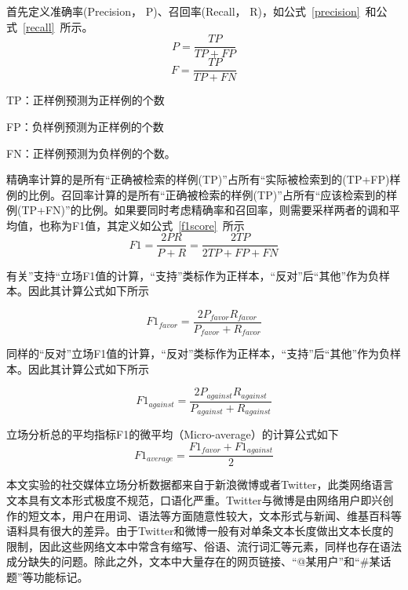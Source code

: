 首先定义准确率(Precision， P)、召回率(Recall， R)，如公式~\ref{precision}~和公式~\ref{recall}~所示。
\begin{equation}\label{precision}P=\frac{TP}{TP+FP}\end{equation}
\begin{equation}\label{recall}F=\frac{TP}{TP+FN}\end{equation}

TP：正样例预测为正样例的个数

FP：负样例预测为正样例的个数

FN：正样例预测为负样例的个数。

精确率计算的是所有“正确被检索的样例(TP)”占所有“实际被检索到的(TP+FP)样例的比例。召回率计算的是所有“正确被检索的样例(TP)”占所有“应该检索到的样例(TP+FN)”的比例。如果要同时考虑精确率和召回率，则需要采样两者的调和平均值，也称为F1值，其定义如公式~\ref{f1score}~所示
\begin{equation}\label{f1score}F1=\frac{2PR}{P+R}=\frac{2TP}{2TP+FP+FN}\end{equation}

有关”支持“立场F1值的计算，“支持”类标作为正样本，“反对”后“其他”作为负样本。因此其计算公式如下所示

\begin{equation}\label{f1favor}F1_{favor}=\frac{2P_{favor}R_{favor}}{P_{favor}+R_{favor}}\end{equation}

同样的“反对”立场F1值的计算，“反对”类标作为正样本，“支持”后“其他”作为负样本。因此其计算公式如下所示

\begin{equation}\label{f1against}F1_{against}=\frac{2P_{against}R_{against}}{P_{against}+R_{against}}\end{equation}

立场分析总的平均指标F1的微平均（Micro-average）的计算公式如下
\begin{equation}\label{f1average}F1_{average}=\frac{F1_{favor}+F1_{against}}{2}\end{equation}

本文实验的社交媒体立场分析数据都来自于新浪微博或者Twitter，此类网络语言文本具有文本形式极度不规范，口语化严重。Twitter与微博是由网络用户即兴创作的短文本，用户在用词、语法等方面随意性较大，文本形式与新闻、维基百科等语料具有很大的差异。由于Twitter和微博一般有对单条文本长度做出文本长度的限制，因此这些网络文本中常含有缩写、俗语、流行词汇等元素，同样也存在语法成分缺失的问题。除此之外，文本中大量存在的网页链接、“@某用户”和“\#某话题”等功能标记。


